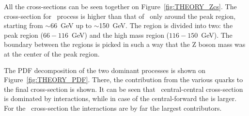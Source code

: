 All the cross-sections can be seen together on Figure~\ref{fig:THEORY_Zcs}. The cross-section for \Zee\ process is higher than that of \gee\ only around the peak region, starting from $\sim$66~GeV up to $\sim$150~GeV. The region is divided into two: the peak region ($66 - 116$~GeV) and the high mass region ($116 - 150$~GeV). The boundary between the regions is picked in such a way that the Z boson mass was at the center of the peak region.


\begin{figure}
\end{figure}

The PDF decomposition of the two dominant processes is shown on Figure~\ref{fig:THEORY_PDF}. There, the contribution from the various quarks to the final cross-section is shown. It can be seen that \Zee\ central-central cross-section is dominated by  interactions, while in case of the central-forward the  is larger. For the \gee\ cross-section the  interactions are by far the largest contributors.
